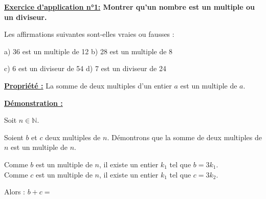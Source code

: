 \documentclass[12pt]{article}
\begin{document}
\vspace{5pt}
\begin{mdframed}[
    linewidth=1pt,
    roundcorner=5pt,
    linecolor=RoyalBlue,
    innertopmargin=10pt,
    innerbottommargin=10pt
]
{\color{RoyalBlue}
\textbf{\underline{Exercice d'application n°1:} Montrer qu'un nombre est un multiple ou un diviseur.}}

\vspace{5pt}
Les affirmations suivantes sont-elles vraies ou fausses : 

\vspace{5pt}
\hspace{1cm}a) 36 est un multiple de 12 \hspace{2cm}b) 28 est un multiple de 8

\vspace{5pt}
\hspace{1cm}c) 6 est un diviseur de 54 \hspace{2.3cm}d) 7 est un diviseur de 24

\vspace{0.5cm}
{\color{black!45}\dotfill}

\vspace{0.5cm}
{\color{black!45}\dotfill}

\vspace{0.5cm}
{\color{black!45}\dotfill}

\vspace{0.5cm}
{\color{black!45}\dotfill}

\vspace{20pt}

\end{mdframed}

\begin{mdframed}[
    linewidth=1pt,
    roundcorner=5pt,
    linecolor=Red,
    innertopmargin=10pt,
    innerbottommargin=10pt
]
{\color{red}
\textbf{\underline{Propriété :}}
La somme de deux multiples d’un entier $a$ est un multiple de $a$.
}
\end{mdframed}

\begin{mdframed}[
    linewidth=1pt,
    roundcorner=5pt,
    linecolor=Plum,
    innertopmargin=10pt,
    innerbottommargin=10pt
]
{\color{Plum}
\textbf{\underline{Démonstration :}}}

\vspace{5pt}
Soit $n \in \mathbb{N}$.

\vspace{5pt}
Soient $b$ et $c$ deux multiples de $n$.
Démontrons que la somme de deux multiples de $n$ est un multiple de $n$.

\vspace{5pt}
Comme $b$ est un multiple de $n$, il existe un entier $k_1$ tel que $b = 3k_1$.
\\Comme $c$ est un multiple de $n$, il existe un entier $k_1$ tel que $c = 3k_2$.

\vspace{5pt}
Alors : $b+c =$

\vspace{0.5cm}
{\color{black!45}\dotfill}

\end{mdframed}
\end{document}
